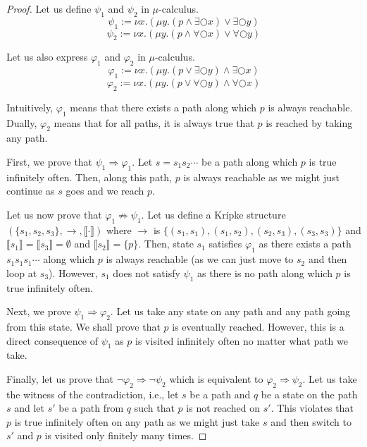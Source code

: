 \begin{proof}


Let us define $\psi_1$ and $\psi_2$ in $\mu$-calculus.
$$\psi_1 := \nu x. (\mu y. (p \land \exists \bigcirc x) \lor \exists \bigcirc y)$$
$$\psi_2 := \nu x. (\mu y. (p \land \forall \bigcirc x) \lor \forall \bigcirc y)$$

Let us also express $\varphi_1$ and $\varphi_2$ in $\mu$-calculus.
$$\varphi_1 := \nu x. (\mu y. (p \lor \exists \bigcirc y) \land \exists \bigcirc x)$$
$$\varphi_2 := \nu x. (\mu y. (p \lor \forall \bigcirc y) \land \forall \bigcirc x)$$

Intuitively, $\varphi_1$ means that there exists a path along which $p$ is always reachable. Dually, $\varphi_2$ means that for all paths, it is always true that $p$ is reached by taking any path.

First, we prove that $\psi_1 \Rightarrow \varphi_1$. Let $s = s_1s_2 \cdots$ be a path along which $p$ is true infinitely often. Then, along this path, $p$ is always reachable as we might just continue as $s$ goes and we reach $p$.

Let us now prove that $\varphi_1 \not\Rightarrow \psi_1$. Let us define a Kripke structure $(\{s_1, s_2, s_3\}, \rightarrow, \llbracket \cdot \rrbracket)$ where $\rightarrow$ is $\{(s_1, s_1), (s_1, s_2), (s_2, s_3), (s_3, s_3)\}$ and $\llbracket s_1 \rrbracket = \llbracket s_3 \rrbracket = \emptyset$ and $\llbracket s_2 \rrbracket = \{p\}$. Then, state $s_1$ satisfies $\varphi_1$ as there exists a path $s_1s_1s_1\cdots$ along which $p$ is always reachable (as we can just move to $s_2$ and then loop at $s_3$). However, $s_1$ does not satisfy $\psi_1$ as there is no path along which $p$ is true infinitely often.

Next, we prove $\psi_1 \Rightarrow \varphi_2$. Let us take any state on any path and any path going from this state. We shall prove that $p$ is eventually reached. However, this is a direct consequence of $\psi_1$ as $p$ is visited infinitely often no matter what path we take.

Finally, let us prove that $\neg \varphi_2 \Rightarrow \neg\psi_2$ which is equivalent to $\varphi_2 \Rightarrow \psi_2$. Let us take the witness of the contradiction, i.e., let $s$ be a path and $q$ be a state on the path $s$ and let $s'$ be a path from $q$ such that $p$ is not reached on $s'$. This violates that $p$ is true infinitely often on any path as we might just take $s$ and then switch to $s'$ and $p$ is visited only finitely many times.
\end{proof}